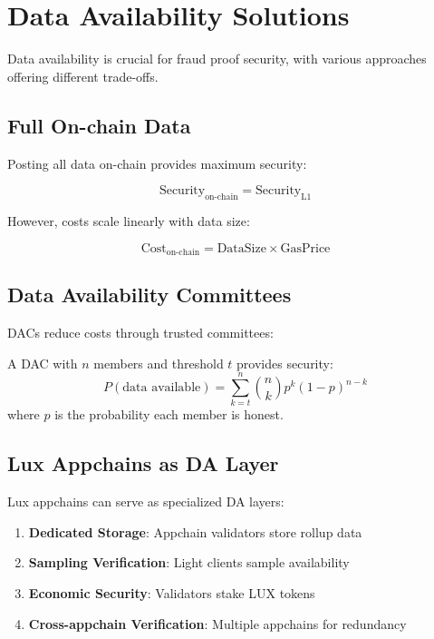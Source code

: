 \section{Data Availability Solutions}


Data availability is crucial for fraud proof security, with various approaches offering different trade-offs.

\subsection{Full On-chain Data}

Posting all data on-chain provides maximum security:

\begin{equation}
\text{Security}_{\text{on-chain}} = \text{Security}_{\text{L1}}
\end{equation}

However, costs scale linearly with data size:

\begin{equation}
\text{Cost}_{\text{on-chain}} = \text{DataSize} \times \text{GasPrice}
\end{equation}

\subsection{Data Availability Committees}

DACs reduce costs through trusted committees:

\begin{definition}
A DAC with $n$ members and threshold $t$ provides security:
\begin{equation}
P(\text{data available}) = \sum_{k=t}^{n} \binom{n}{k} p^k (1-p)^{n-k}
\end{equation}
where $p$ is the probability each member is honest.
\end{definition}

\subsection{Lux Appchains as DA Layer}

Lux appchains can serve as specialized DA layers:

\begin{enumerate}
    \item \textbf{Dedicated Storage}: Appchain validators store rollup data
    \item \textbf{Sampling Verification}: Light clients sample availability
    \item \textbf{Economic Security}: Validators stake LUX tokens
    \item \textbf{Cross-appchain Verification}: Multiple appchains for redundancy
\end{enumerate}

